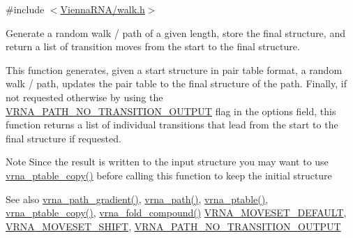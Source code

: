 {\ttfamily \#include $<$\hyperlink{walk_8h}{Vienna\+R\+N\+A/walk.\+h}$>$}



Generate a random walk / path of a given length, store the final structure, and return a list of transition moves from the start to the final structure. 

This function generates, given a start structure in pair table format, a random walk / path, updates the pair table to the final structure of the path. Finally, if not requested otherwise by using the \hyperlink{group__paths_ga1ee63e54ecf136491e12ff03ede2622d}{V\+R\+N\+A\+\_\+\+P\+A\+T\+H\+\_\+\+N\+O\+\_\+\+T\+R\+A\+N\+S\+I\+T\+I\+O\+N\+\_\+\+O\+U\+T\+P\+UT} flag in the {\ttfamily options} field, this function returns a list of individual transitions that lead from the start to the final structure if requested.

\begin{DoxyNote}{Note}
Since the result is written to the input structure you may want to use \hyperlink{group__struct__utils__pair__table_ga2daefbbd6d9f8803731651882f54332d}{vrna\+\_\+ptable\+\_\+copy()} before calling this function to keep the initial structure
\end{DoxyNote}
\begin{DoxySeeAlso}{See also}
\hyperlink{group__paths_gae92cce443a8a64f7b7fb89867b7d6125}{vrna\+\_\+path\+\_\+gradient()}, \hyperlink{group__paths_gab6aee4143f8b103518d5cbfe6bfe5eae}{vrna\+\_\+path()}, \hyperlink{group__struct__utils__pair__table_gae829fb8bb7f694c12a9c0bbc34c77c60}{vrna\+\_\+ptable()}, \hyperlink{group__struct__utils__pair__table_ga2daefbbd6d9f8803731651882f54332d}{vrna\+\_\+ptable\+\_\+copy()}, \hyperlink{group__fold__compound_ga6601d994ba32b11511b36f68b08403be}{vrna\+\_\+fold\+\_\+compound()} \hyperlink{group__neighbors_gaa5ffec4dd0d02df320f123e6888154d1}{V\+R\+N\+A\+\_\+\+M\+O\+V\+E\+S\+E\+T\+\_\+\+D\+E\+F\+A\+U\+LT}, \hyperlink{group__neighbors_ga68ea27c81de4b74e48b775c04052590b}{V\+R\+N\+A\+\_\+\+M\+O\+V\+E\+S\+E\+T\+\_\+\+S\+H\+I\+FT}, \hyperlink{group__paths_ga1ee63e54ecf136491e12ff03ede2622d}{V\+R\+N\+A\+\_\+\+P\+A\+T\+H\+\_\+\+N\+O\+\_\+\+T\+R\+A\+N\+S\+I\+T\+I\+O\+N\+\_\+\+O\+U\+T\+P\+UT}
\end{DoxySeeAlso}

